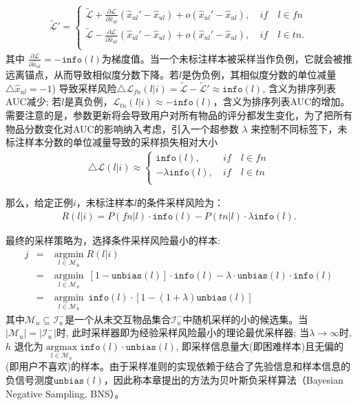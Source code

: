 \begin{eqnarray}
	\tilde{	\mathcal{L}}' =\left\{
	\begin{aligned}
		\tilde{\mathcal{L}} +  \frac{\partial \mathcal{L}} {\partial \hat{x}_{ul}}  ( \hat{x}_{ul}' - \hat{x}_{ul}) + o( \hat{x}_{ul}' - \hat{x}_{ul}) ,~ &if&~ l \in fn\\
		\tilde{\mathcal{L}} -  \frac{\partial \mathcal{L}} {\partial \hat{x}_{ul}}  ( \hat{x}_{ul}' - \hat{x}_{ul}) + o( \hat{x}_{ul}' - \hat{x}_{ul}) ,~ &if&~ l \in tn.\\
	\end{aligned}
	\right.
\end{eqnarray}
其中 $ \frac{\partial \mathcal{L}} {\partial \hat{x}_{ul}} = -\mathtt{info}(l) $为梯度值。当一个未标注样本被采样当作负例，它就会被推远离锚点，从而导致相似度分数下降。若$l$是伪负例，其相似度分数的单位减量$\triangle \hat{x}_{ul}=-1$) 导致采样风险$\triangle \mathcal{L}_{fn}(l|i) = \tilde{\mathcal{L}}-\tilde{\mathcal{L}}' \approx \mathtt{info}(l)$, 含义为排序列表AUC减少; 若$l$是真负例，$\mathcal{L}_{tn}(l|i)  \approx -\mathtt{info}(l) $，含义为排序列表AUC的增加。需要注意的是，参数更新将会导致用户对所有物品的评分都发生变化，为了把所有物品分数变化对AUC的影响纳入考虑，引入一个超参数 $\lambda$ 来控制不同标签下，未标注样本分数的单位减量导致的采样损失相对大小
\begin{eqnarray} \label{Eq:rankinggain}
	\triangle	\mathcal{L}(l|i)  \approx \left\{
	\begin{aligned}
		\mathtt{info}(l) ,~ &if&~ l \in fn\\
		- \lambda \mathtt{info}(l) ,~ &if&~ l \in tn\\
	\end{aligned}
	\right.
\end{eqnarray}

那么，给定正例$i$，未标注样本$l$的条件采样风险为：
\begin{eqnarray}
	R(l|i) = P(fn|l) \cdot \mathtt{info}(l) - P(tn|l)\cdot \lambda\mathtt{info}(l).
\end{eqnarray}

最终的采样策略为，选择条件采样风险最小的样本:
\begin{eqnarray} \label{Eq:NegativeSam}
	j   &=&   \mathop{\arg\min}\limits_{l \in \mathcal{M}_u} R(l|i) \nonumber \\
	&=& \mathop{\arg\min}\limits_{l \in \mathcal{M}_u}~ [1-\mathtt{unbias}(l)] \cdot \mathtt{info}(l)- \lambda \cdot \mathtt{unbias}(l) \cdot \mathtt{info}(l)  \nonumber \\
	&=& \mathop{\arg\min}\limits_{l \in\mathcal{M}_u}~ \mathtt{info}(l)\cdot [1-(1+\lambda)\mathtt{unbias}(l)]
\end{eqnarray}
其中$\mathcal{M}_u \subseteq  \mathcal{I}_u^-$是一个从未交互物品集合$\mathcal{I}_u^-$中随机采样的小的候选集。当 $|\mathcal{M}_u| = |\mathcal{I}_u^-|$时, 此时采样器即为经验采样风险最小的理论最优采样器; 当$\lambda \rightarrow \infty$时, $h$ 退化为$\mathop{\arg\max}\limits_{l \in\mathcal{M}_u} \mathtt{info}(l)\cdot \mathtt{unbias}(l)$, 即采样信息量大(即困难样本)且无偏的(即用户不喜欢)的样本。由于采样准则的实现依赖于结合了先验信息和样本信息的负信号测度$\mathtt{unbias}(l)$，因此称本章提出的方法为贝叶斯负采样算法（Bayesian Negative Sampling, BNS）。

